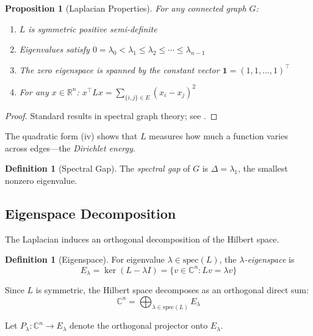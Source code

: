 \documentclass[11pt,a4paper]{article}
\newtheorem{proposition}[theorem]{Proposition}
\theoremstyle{definition}
\newtheorem{definition}[theorem]{Definition}
\newcommand{\C}{\mathbb{C}}
\newcommand{\R}{\mathbb{R}}
\newcommand{\spec}{\mathrm{spec}}
\begin{document}
\begin{proposition}[Laplacian Properties]
\label{prop:laplacian_properties}
For any connected graph $G$:
\begin{enumerate}[label=(\roman*),noitemsep]
    \item $L$ is symmetric positive semi-definite
    \item Eigenvalues satisfy $0 = \lambda_0 < \lambda_1 \leq \lambda_2 \leq \cdots \leq \lambda_{n-1}$
    \item The zero eigenspace is spanned by the constant vector $\mathbf{1} = (1,1,\ldots,1)^\top$
    \item For any $x \in \R^n$: $x^\top L x = \sum_{\{i,j\} \in E} (x_i - x_j)^2$
\end{enumerate}
\end{proposition}

\begin{proof}
Standard results in spectral graph theory; see \cite{chung1997spectral}.
\end{proof}

The quadratic form (iv) shows that $L$ measures how much a function varies across edges---the \emph{Dirichlet energy}.

\begin{definition}[Spectral Gap]
The \emph{spectral gap} of $G$ is $\Delta = \lambda_1$, the smallest nonzero eigenvalue.
\end{definition}

\subsection{Eigenspace Decomposition}

The Laplacian induces an orthogonal decomposition of the Hilbert space.

\begin{definition}[Eigenspace]
For eigenvalue $\lambda \in \spec(L)$, the \emph{$\lambda$-eigenspace} is
\begin{equation}
    E_\lambda = \ker(L - \lambda I) = \{v \in \C^n : Lv = \lambda v\}
\end{equation}
\end{definition}

Since $L$ is symmetric, the Hilbert space decomposes as an orthogonal direct sum:
\begin{equation}
    \C^n = \bigoplus_{\lambda \in \spec(L)} E_\lambda
\end{equation}

Let $P_\lambda : \C^n \to E_\lambda$ denote the orthogonal projector onto $E_\lambda$.
\end{document}
